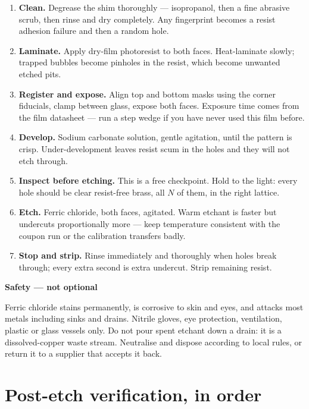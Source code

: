 \documentclass[11pt]{report}
\newenvironment{warnbox}[1]%
{\par\vspace{8pt}\begin{lrbox}{\wbsave}\begin{minipage}{0.88\textwidth}%
{\bfseries\color{warnred}#1}\par\vspace{4pt}\ignorespaces}%
{\end{minipage}\end{lrbox}%
\begin{center}\setlength{\fboxrule}{1.2pt}\setlength{\fboxsep}{8pt}%
\fcolorbox{warnred}{white}{\usebox{\wbsave}}\end{center}\vspace{8pt}\par}
\begin{document}
\begin{enumerate}[leftmargin=1.2cm]
\item \textbf{Clean.} Degrease the shim thoroughly --- isopropanol, then a fine abrasive scrub,
then rinse and dry completely. Any fingerprint becomes a resist adhesion failure and then a
random hole.
\item \textbf{Laminate.} Apply dry-film photoresist to both faces. Heat-laminate slowly; trapped
bubbles become pinholes in the resist, which become unwanted etched pits.
\item \textbf{Register and expose.} Align top and bottom masks using the corner fiducials, clamp
between glass, expose both faces. Exposure time comes from the film datasheet --- run a step
wedge if you have never used this film before.
\item \textbf{Develop.} Sodium carbonate solution, gentle agitation, until the pattern is crisp.
Under-development leaves resist scum in the holes and they will not etch through.
\item \textbf{Inspect before etching.} This is a free checkpoint. Hold to the light: every hole
should be clear resist-free brass, all $N$ of them, in the right lattice.
\item \textbf{Etch.} Ferric chloride, both faces, agitated. Warm etchant is faster but undercuts
proportionally more --- keep temperature consistent with the coupon run or the calibration
transfers badly.
\item \textbf{Stop and strip.} Rinse immediately and thoroughly when holes break through; every
extra second is extra undercut. Strip remaining resist.
\end{enumerate}

\begin{warnbox}{Safety --- not optional}
Ferric chloride stains permanently, is corrosive to skin and eyes, and attacks most metals
including sinks and drains. Nitrile gloves, eye protection, ventilation, plastic or glass vessels
only. Do not pour spent etchant down a drain: it is a dissolved-copper waste stream. Neutralise
and dispose according to local rules, or return it to a supplier that accepts it back.
\end{warnbox}

\section{Post-etch verification, in order}
\end{document}
